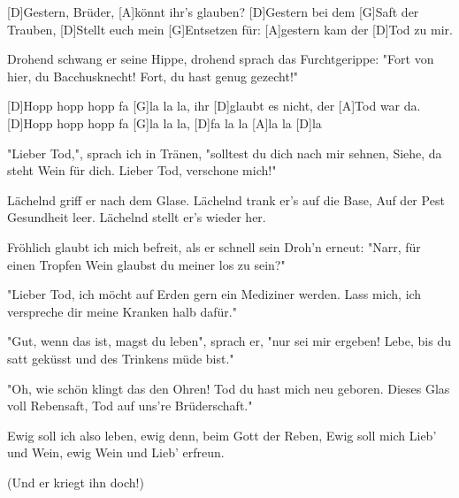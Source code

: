 \vspace{-1.2em}

\begin{guitar}
	
	[D]Gestern, Brüder, [A]könnt ihr's glauben? [D]Gestern bei dem [G]Saft der Trauben,
	[D]Stellt euch mein [G]Entsetzen für: [A]gestern kam der [D]Tod zu mir.
	
	Drohend schwang er seine Hippe, drohend sprach das Furchtgerippe:
	"Fort von hier, du Bacchusknecht! Fort, du hast genug gezecht!"
	
	[D]Hopp hopp hopp fa [G]la la la, ihr [D]glaubt es nicht, der [A]Tod war da.
	[D]Hopp hopp hopp fa [G]la la la, [D]fa la la [A]la la [D]la
	
	"Lieber Tod,", sprach ich in Tränen, "solltest du dich nach mir sehnen,
	Siehe, da steht Wein für dich. Lieber Tod, verschone mich!"
	
	Lächelnd griff er nach dem Glase. Lächelnd trank er's auf die Base,
	Auf der Pest Gesundheit leer. Lächelnd stellt er's wieder her.
	
	 
	
	Fröhlich glaubt ich mich befreit, als er schnell sein Droh'n erneut:
	"Narr, für einen Tropfen Wein glaubst du meiner los zu sein?"
	
	"Lieber Tod, ich möcht auf Erden gern ein Mediziner werden.
	Lass mich, ich verspreche dir meine Kranken halb dafür."
	
	 
	
	"Gut, wenn das ist, magst du leben", sprach er, "nur sei mir ergeben!
	Lebe, bis du satt geküsst und des Trinkens müde bist."
	
	"Oh, wie schön klingt das den Ohren! Tod du hast mich neu geboren.
	Dieses Glas voll Rebensaft, Tod auf uns're Brüderschaft."
	
	 
	
	Ewig soll ich also leben, ewig denn, beim Gott der Reben,
	Ewig soll mich Lieb' und Wein, ewig Wein und Lieb' erfreun.
	
	  (Und er kriegt ihn doch!)
\end{guitar}